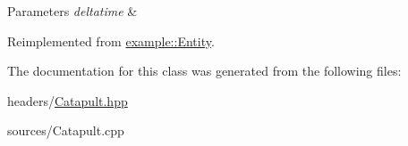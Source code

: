 \begin{DoxyParams}{Parameters}
{\em deltatime} & \\
\hline
\end{DoxyParams}


Reimplemented from \mbox{\hyperlink{classexample_1_1_entity_a1f987399c6c2f5e83b2d245d81cc3b7e}{example\+::\+Entity}}.



The documentation for this class was generated from the following files\+:\begin{DoxyCompactItemize}
\item 
headers/\mbox{\hyperlink{_catapult_8hpp}{Catapult.\+hpp}}\item 
sources/Catapult.\+cpp\end{DoxyCompactItemize}
